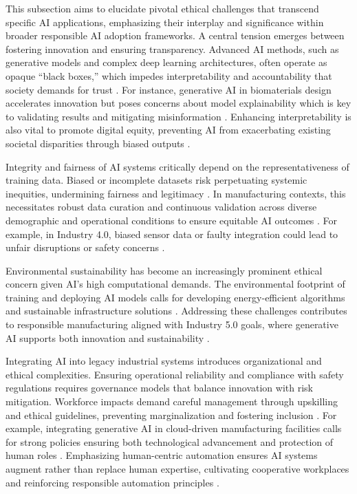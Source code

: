 \documentclass[sigconf]{acmart}
\begin{document}
This subsection aims to elucidate pivotal ethical challenges that transcend specific AI applications, emphasizing their interplay and significance within broader responsible AI adoption frameworks. A central tension emerges between fostering innovation and ensuring transparency. Advanced AI methods, such as generative models and complex deep learning architectures, often operate as opaque “black boxes,” which impedes interpretability and accountability that society demands for trust \cite{ref7,ref8}. For instance, generative AI in biomaterials design accelerates innovation but poses concerns about model explainability which is key to validating results and mitigating misinformation \cite{ref7}. Enhancing interpretability is also vital to promote digital equity, preventing AI from exacerbating existing societal disparities through biased outputs \cite{ref6,ref17}.

Integrity and fairness of AI systems critically depend on the representativeness of training data. Biased or incomplete datasets risk perpetuating systemic inequities, undermining fairness and legitimacy \cite{ref37}. In manufacturing contexts, this necessitates robust data curation and continuous validation across diverse demographic and operational conditions to ensure equitable AI outcomes \cite{ref20}. For example, in Industry 4.0, biased sensor data or faulty integration could lead to unfair disruptions or safety concerns \cite{ref38}.

Environmental sustainability has become an increasingly prominent ethical concern given AI's high computational demands. The environmental footprint of training and deploying AI models calls for developing energy-efficient algorithms and sustainable infrastructure solutions \cite{ref19}. Addressing these challenges contributes to responsible manufacturing aligned with Industry 5.0 goals, where generative AI supports both innovation and sustainability \cite{ref6}.

Integrating AI into legacy industrial systems introduces organizational and ethical complexities. Ensuring operational reliability and compliance with safety regulations requires governance models that balance innovation with risk mitigation. Workforce impacts demand careful management through upskilling and ethical guidelines, preventing marginalization and fostering inclusion \cite{ref11,ref12,ref38}. For example, integrating generative AI in cloud-driven manufacturing facilities calls for strong policies ensuring both technological advancement and protection of human roles \cite{ref11,ref12}. Emphasizing human-centric automation ensures AI systems augment rather than replace human expertise, cultivating cooperative workplaces and reinforcing responsible automation principles \cite{ref2}.
\end{document}
